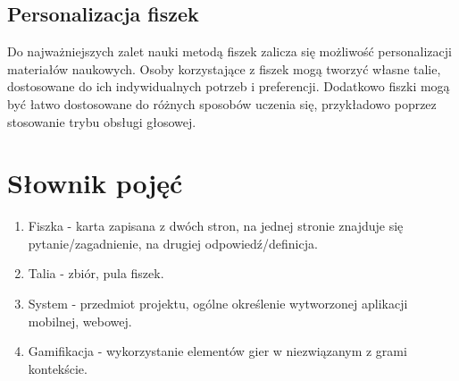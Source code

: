 \subsection{Personalizacja fiszek}

Do najważniejszych zalet nauki metodą fiszek zalicza się możliwość personalizacji materiałów naukowych. Osoby korzystające z fiszek mogą tworzyć własne talie, dostosowane do ich indywidualnych potrzeb i preferencji. Dodatkowo fiszki mogą być łatwo dostosowane do różnych sposobów uczenia się, przykładowo poprzez stosowanie trybu obsługi głosowej.

\section{Słownik pojęć}

\begin{enumerate}
    \item Fiszka - karta zapisana z dwóch stron, na jednej stronie znajduje się pytanie/zagadnienie, na drugiej odpowiedź/definicja.
    \item Talia - zbiór, pula fiszek.
    \item System - przedmiot projektu, ogólne określenie wytworzonej aplikacji mobilnej, webowej.
    \item Gamifikacja - wykorzystanie elementów gier w niezwiązanym z grami kontekście.
    \end{enumerate}

\printbibliography
